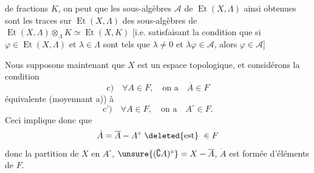 
de fractions $K$, on peut  que les sous-algèbres $\mathcal A$ de $\operatorname{Et}(X,\Lambda)$ ainsi obtenues sont les traces sur $\operatorname{Et}(X,\Lambda)$ des sous-algèbres de $\operatorname{Et}(X,\Lambda)\otimes_\Lambda K\simeq\operatorname{Et}(X,K)$ [i.e. satisfaisant la condition que si $\varphi\in\operatorname{Et}(X,\Lambda)$  et $\lambda\in\Lambda$  sont tels que $\lambda\ne0$ et $\lambda\varphi\in\mathcal A$, alors $\varphi\in\mathcal A$]


Nous supposons maintenant que $X$ est un espace topologique, et considérons la condition
\[
\text{c)}\quad\forall A\in F,\quad\text{on a}\quad\overline A\in F
\]
équivalente (moyennant a)) à
\[
\text{c')}\quad\forall A\in F,\quad\text{on a}\quad A^\circ\in F.
\]
Ceci implique donc que
\[
\dot A=\overline A-A^\circ\ \deleted{\text{est}}\ \in F
\]
donc la  partition de $X$ en $A^\circ$, $\unsure{(\complement A)^\circ}=X-\overline A$, $\dot A$ est formée d'éléments de $F$.



